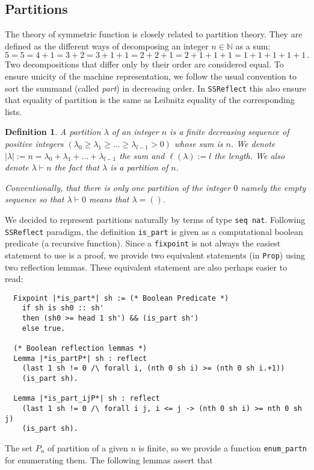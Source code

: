 \documentclass[12pt,a4paper]{article}
\let\verb=\lstinline
\newcommand{\SSR}{\texttt{SSReflect}\xspace}
\newcommand{\N}{{\mathbb N}}
\newcommand{\partof}{\vdash}                    % Partition de
\newtheorem{DEFN}{Definition}
\begin{document}
\subsection{Partitions}

The theory of symmetric function is closely related to partition theory. They
are defined as the different ways of decomposing an integer $n\in\N$ as a sum:
\[ 5=5=4+1=3+2=3+1+1=2+2+1=2+1+1+1=1+1+1+1+1\,. \] Two decompositions that
differ only by their order are considered equal. To ensure unicity of the
machine representation, we follow the usual convention to sort the summand
(called \emph{part}) in decreasing order. In \SSR this also ensure that
equality of partition is the same as Leibnitz equality of the corresponding
lists.
\begin{DEFN}
  A \emph{partition} $\lambda$ of an integer $n$ is a finite decreasing
  sequence of positive integers
  $(\lambda_0\geq\lambda_1\geq\dots\geq\lambda_{l-1} > 0)$ whose sum is
  $n$. We denote $|\lambda| := n = \lambda_0+\lambda_1+\dots+\lambda_{l-1}$
  the sum and $\ell(\lambda) := l$ the length. We also denote $\lambda\partof
  n$ the fact that $\lambda$ is a partition of $n$.

  Conventionally, that there is only one partition of the integer $0$ namely
  the empty sequence so that $\lambda\partof0$ means that $\lambda = ()$.
\end{DEFN}
We decided to represent partitions naturally by terms of type 
\verb+seq nat+.
Following \SSR paradigm, the definition \verb|is_part| is given as
a computational boolean predicate (a recursive function). Since a
\verb{fixpoint} is not always the easiest statement to use is a proof, we
provide two equivalent statements (in \verb|Prop|) using two reflection
lemmas. These equivalent statement are also perhaps easier to read:
\begin{lstlisting}
  Fixpoint |*is_part*| sh := (* Boolean Predicate *)
    if sh is sh0 :: sh'
    then (sh0 >= head 1 sh') && (is_part sh')
    else true.

  (* Boolean reflection lemmas *)
  Lemma |*is_partP*| sh : reflect
    (last 1 sh != 0 /\ forall i, (nth 0 sh i) >= (nth 0 sh i.+1))
    (is_part sh).

  Lemma |*is_part_ijP*| sh : reflect
    (last 1 sh != 0 /\ forall i j, i <= j -> (nth 0 sh i) >= nth 0 sh j)
    (is_part sh).
\end{lstlisting}
The set $P_n$ of partition of a given $n$ is finite, so we provide a function
\verb|enum_partn| for enumerating them. The following lemmas assert that
\end{document}
